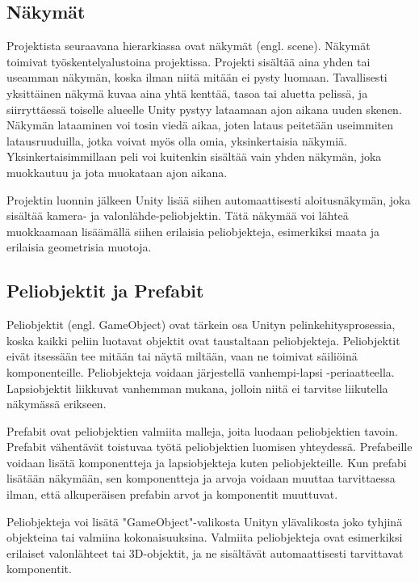 \documentclass[utf8]{gradu3}
\begin{document}
\subsection{Näkymät}

Projektista seuraavana hierarkiassa ovat näkymät (engl. scene). Näkymät toimivat työskentelyalustoina projektissa. Projekti sisältää aina yhden tai useamman näkymän, koska ilman niitä mitään ei pysty luomaan. Tavallisesti yksittäinen näkymä kuvaa aina yhtä kenttää, tasoa tai aluetta pelissä, ja siirryttäessä toiselle alueelle Unity pystyy lataamaan ajon aikana uuden skenen. Näkymän lataaminen voi tosin viedä aikaa, joten lataus peitetään useimmiten latausruuduilla, jotka voivat myös olla omia, yksinkertaisia näkymiä. Yksinkertaisimmillaan peli voi kuitenkin sisältää vain yhden näkymän, joka muokkautuu ja jota muokataan ajon aikana.

Projektin luonnin jälkeen Unity lisää siihen automaattisesti aloitusnäkymän, joka sisältää kamera- ja valonlähde-peliobjektin. Tätä näkymää voi lähteä muokkaamaan lisäämällä siihen erilaisia peliobjekteja, esimerkiksi maata ja erilaisia geometrisia muotoja.

\subsection{Peliobjektit ja Prefabit}

Peliobjektit (engl. GameObject) ovat tärkein osa Unityn pelinkehitysprosessia, koska kaikki peliin luotavat objektit ovat taustaltaan peliobjekteja. Peliobjektit eivät itsessään tee mitään tai näytä miltään, vaan ne toimivat säiliöinä komponenteille. Peliobjekteja voidaan järjestellä vanhempi-lapsi -periaatteella. Lapsiobjektit liikkuvat vanhemman mukana, jolloin niitä ei tarvitse liikutella näkymässä erikseen.

Prefabit ovat peliobjektien valmiita malleja, joita luodaan peliobjektien tavoin. Prefabit vähentävät toistuvaa työtä peliobjektien luomisen yhteydessä. Prefabeille voidaan lisätä komponentteja ja lapsiobjekteja kuten peliobjekteille. Kun prefabi lisätään näkymään, sen komponentteja ja arvoja voidaan muuttaa tarvittaessa ilman, että alkuperäisen prefabin arvot ja komponentit muuttuvat.

Peliobjekteja voi lisätä "GameObject"-valikosta Unityn ylävalikosta joko tyhjinä objekteina tai valmiina kokonaisuuksina. Valmiita peliobjekteja ovat esimerkiksi erilaiset valonlähteet tai 3D-objektit, ja ne sisältävät automaattisesti tarvittavat komponentit.
\end{document}
